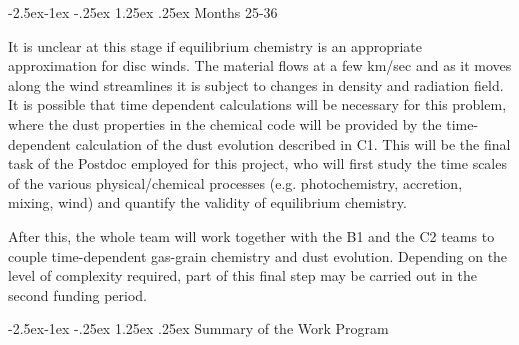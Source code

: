 \documentclass[10pt,fleqn,twoside]{article}
\makeatletter
\renewcommand\paragraph{\@startsection{paragraph}{4}{\z@}%
            {-2.5ex\@plus -1ex \@minus -.25ex}%
            {1.25ex \@plus .25ex}%
            {\normalfont\normalsize\bfseries}}
\makeatother
\begin{document}
\paragraph{ Months 25-36}

 It is unclear at this stage
if equilibrium chemistry is an appropriate approximation for disc
winds. The material flows at a few km/sec and as it moves along the
wind streamlines it is subject to changes in density and radiation
field. It is possible that time  dependent calculations will be necessary for this problem, where the dust properties in the chemical code will be provided by the time-dependent calculation of the dust evolution described in C1. This will be the final task of the Postdoc employed for this project, who will first study the time scales of the various physical/chemical processes (e.g. photochemistry, accretion, mixing, wind) and quantify the validity of equilibrium chemistry.

After this, the whole team will work together with the B1 and the C2 teams to couple time-dependent gas-grain chemistry and dust evolution.  Depending on the level of complexity required, part of this final step may be carried out in the second funding period.

\paragraph{Summary of the Work Program}
\end{document}
